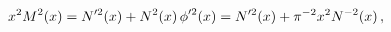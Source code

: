 \[x^{2}{\mathop{M\/}\nolimits^{2}}\!\left(x\right)={\mathop{N\/}\nolimits'^{2}}%
\!\left(x\right)+{\mathop{N\/}\nolimits^{2}}\!\left(x\right){\mathop{\phi\/}%
\nolimits'^{2}}\!\left(x\right)={\mathop{N\/}\nolimits'^{2}}\!\left(x\right)+%
\pi^{-2}x^{2}{\mathop{N\/}\nolimits^{-2}}\!\left(x\right),\]
